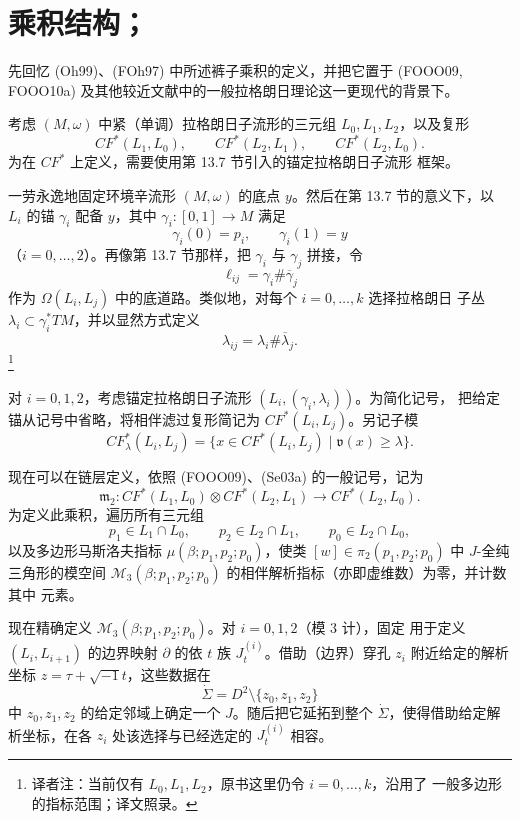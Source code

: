 \section{乘积结构；\termTriangleProduct{}}
\label{sec:triangle-product}

先回忆 (Oh99)、(FOh97) 中所述裤子乘积的定义，并把它置于 (FOOO09,
FOOO10a) 及其他较近文献中的一般拉格朗日\personFloer{}理论这一更现代的背景下。

考虑 $(M,\omega)$ 中紧（单调）拉格朗日子流形的三元组 $L_0,L_1,L_2$，以及\personFloer{}复形
\[
 CF^*(L_1,L_0),\qquad CF^*(L_2,L_1),\qquad CF^*(L_2,L_0).
\]
为在 $CF^*$ 上定义\termFilteredTriangleProduct{}，需要使用第 13.7 节引入的锚定拉格朗日子流形
框架。

一劳永逸地固定环境辛流形 $(M,\omega)$ 的底点 $y$。然后在第 13.7 节的意义下，以
$L_i$ 的锚 $\gamma_i$ 配备 $y$，其中
$\gamma_i:[0,1]\to M$ 满足
\[
 \gamma_i(0)=p_i,\qquad\gamma_i(1)=y
\]
（$i=0,\ldots,2$）。再像第 13.7 节那样，把 $\gamma_i$ 与 $\gamma_j$ 拼接，令
\[
 \ell_{ij}=\gamma_i\#\overline\gamma_j
\]
作为 $\Omega(L_i,L_j)$ 中的底道路。类似地，对每个 $i=0,\ldots,k$ 选择拉格朗日
子丛 $\lambda_i\subset\gamma_i^*TM$，并以显然方式定义
\[
 \lambda_{ij}=\lambda_i\#\overline\lambda_j.
\]
\footnote{译者注：当前仅有 $L_0,L_1,L_2$，原书这里仍令 $i=0,\ldots,k$，沿用了
一般多边形的指标范围；译文照录。}

对 $i=0,1,2$，考虑锚定拉格朗日子流形 $(L_i,(\gamma_i,\lambda_i))$。为简化记号，
把给定锚从记号中省略，将相伴滤过\personFloer{}复形简记为 $CF^*(L_i,L_j)$。另记子模
\[
 CF_\lambda^*(L_i,L_j)=\{x\in CF^*(L_i,L_j)\mid\mathfrak v(x)\geq\lambda\}.
\]

现在可以在链层定义\termTriangleProduct{}，依照 (FOOO09)、(Se03a) 的一般记号，记为
\begin{equation}
 \mathfrak m_2:CF^*(L_1,L_0)\otimes CF^*(L_2,L_1)
 \longrightarrow CF^*(L_2,L_0).
\label{eq:triangle-product-chain-level}
\end{equation}
为定义此乘积，遍历所有三元组
\[
 p_1\in L_1\cap L_0,\qquad
 p_2\in L_2\cap L_1,\qquad
 p_0\in L_2\cap L_0,
\]
以及多边形马斯洛夫指标 $\mu(\beta;p_1,p_2;p_0)$，使类
$[w]\in\pi_2(p_1,p_2;p_0)$ 中 $J$-全纯三角形的模空间
$\mathcal M_3(\beta;p_1,p_2;p_0)$ 的相伴解析指标（亦即虚维数）为零，并计数其中
元素。

现在精确定义 $\mathcal M_3(\beta;p_1,p_2;p_0)$。对 $i=0,1,2$（模 $3$ 计），固定
用于定义 $(L_i,L_{i+1})$ 的\personFloer{}边界映射 $\partial$ 的依 $t$ 族
$J_t^{(i)}$。借助（边界）穿孔 $z_i$ 附近给定的解析坐标
$z=\tau+\sqrt{-1}t$，这些数据在
\[
 \dot\Sigma=D^2\setminus\{z_0,z_1,z_2\}
\]
中 $z_0,z_1,z_2$ 的给定邻域上确定一个\termDomainDependentFamily{} $J$。随后把它延拓到整个
$\dot\Sigma$，使得借助给定解析坐标，在各 $z_i$ 处该选择与已经选定的
$J_t^{(i)}$ 相容。

